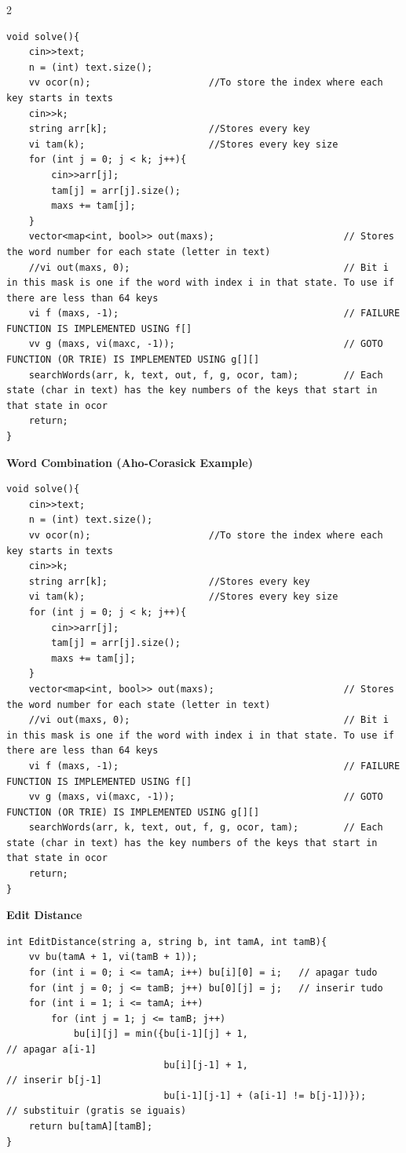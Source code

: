 \documentclass{article}
\begin{document}
\begin{multicols}{2}
\begin{lstlisting}
void solve(){
	cin>>text;
	n = (int) text.size();
	vv ocor(n);                     //To store the index where each key starts in texts
	cin>>k;
	string arr[k];                  //Stores every key
	vi tam(k);                      //Stores every key size
	for (int j = 0; j < k; j++){
		cin>>arr[j];
		tam[j] = arr[j].size();
		maxs += tam[j];
	}
	vector<map<int, bool>> out(maxs);                       // Stores the word number for each state (letter in text)
	//vi out(maxs, 0);                                      // Bit i in this mask is one if the word with index i in that state. To use if there are less than 64 keys
	vi f (maxs, -1);                                        // FAILURE FUNCTION IS IMPLEMENTED USING f[]
	vv g (maxs, vi(maxc, -1));                              // GOTO FUNCTION (OR TRIE) IS IMPLEMENTED USING g[][]
	searchWords(arr, k, text, out, f, g, ocor, tam);        // Each state (char in text) has the key numbers of the keys that start in that state in ocor  
	return;
}	
\end{lstlisting}

\large
\Large\textbf{Word Combination (Aho-Corasick Example)}
\large
\begin{lstlisting}
void solve(){
	cin>>text;
	n = (int) text.size();
	vv ocor(n);                     //To store the index where each key starts in texts
	cin>>k;
	string arr[k];                  //Stores every key
	vi tam(k);                      //Stores every key size
	for (int j = 0; j < k; j++){
		cin>>arr[j];
		tam[j] = arr[j].size();
		maxs += tam[j];
	}
	vector<map<int, bool>> out(maxs);                       // Stores the word number for each state (letter in text)
	//vi out(maxs, 0);                                      // Bit i in this mask is one if the word with index i in that state. To use if there are less than 64 keys
	vi f (maxs, -1);                                        // FAILURE FUNCTION IS IMPLEMENTED USING f[]
	vv g (maxs, vi(maxc, -1));                              // GOTO FUNCTION (OR TRIE) IS IMPLEMENTED USING g[][]
	searchWords(arr, k, text, out, f, g, ocor, tam);        // Each state (char in text) has the key numbers of the keys that start in that state in ocor  
	return;
}
\end{lstlisting}


\large
\Large\textbf{Edit Distance}
\large
\begin{lstlisting}
int EditDistance(string a, string b, int tamA, int tamB){
	vv bu(tamA + 1, vi(tamB + 1));
	for (int i = 0; i <= tamA; i++) bu[i][0] = i;   // apagar tudo
	for (int j = 0; j <= tamB; j++) bu[0][j] = j;   // inserir tudo
	for (int i = 1; i <= tamA; i++)
		for (int j = 1; j <= tamB; j++)
			bu[i][j] = min({bu[i-1][j] + 1,                          // apagar a[i-1]
			                bu[i][j-1] + 1,                          // inserir b[j-1]
			                bu[i-1][j-1] + (a[i-1] != b[j-1])});     // substituir (gratis se iguais)
	return bu[tamA][tamB];
}
\end{lstlisting}


\end{multicols}
\end{document}
